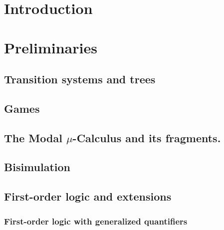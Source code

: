 \documentclass[prodmode,acmtecs]{acmsmall} %
\begin{document}

\clearpage

\tableofcontents

\clearpage



\section{Introduction}\label{sec:intro}


\clearpage


\section{Preliminaries}\label{sec:prel}

\subsection{Transition systems and trees} \label{ssec:prelim_trees}

\subsection{Games}



\subsection{The Modal $\mu$-Calculus and its fragments.}\label{subsec:mu}



\subsection{Bisimulation}


\subsection{First-order logic and extensions}

\subsubsection{First-order logic with generalized quantifiers}

%
\end{document}
